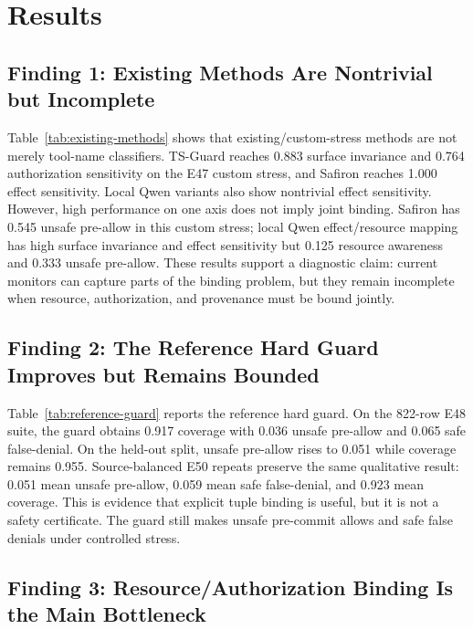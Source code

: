 \section{Results}

\subsection{Finding 1: Existing Methods Are Nontrivial but Incomplete}



Table~\ref{tab:existing-methods} shows that existing/custom-stress methods are not merely tool-name classifiers. TS-Guard reaches 0.883 surface invariance and 0.764 authorization sensitivity on the E47 custom stress, and Safiron reaches 1.000 effect sensitivity. Local Qwen variants also show nontrivial effect sensitivity. However, high performance on one axis does not imply joint binding. Safiron has 0.545 unsafe pre-allow in this custom stress; local Qwen effect/resource mapping has high surface invariance and effect sensitivity but 0.125 resource awareness and 0.333 unsafe pre-allow. These results support a diagnostic claim: current monitors can capture parts of the binding problem, but they remain incomplete when resource, authorization, and provenance must be bound jointly.

\subsection{Finding 2: The Reference Hard Guard Improves but Remains Bounded}



Table~\ref{tab:reference-guard} reports the reference hard guard. On the 822-row E48 suite, the guard obtains 0.917 coverage with 0.036 unsafe pre-allow and 0.065 safe false-denial. On the held-out split, unsafe pre-allow rises to 0.051 while coverage remains 0.955. Source-balanced E50 repeats preserve the same qualitative result: 0.051 mean unsafe pre-allow, 0.059 mean safe false-denial, and 0.923 mean coverage. This is evidence that explicit tuple binding is useful, but it is not a safety certificate. The guard still makes unsafe pre-commit allows and safe false denials under controlled stress.

\subsection{Finding 3: Resource/Authorization Binding Is the Main Bottleneck}


